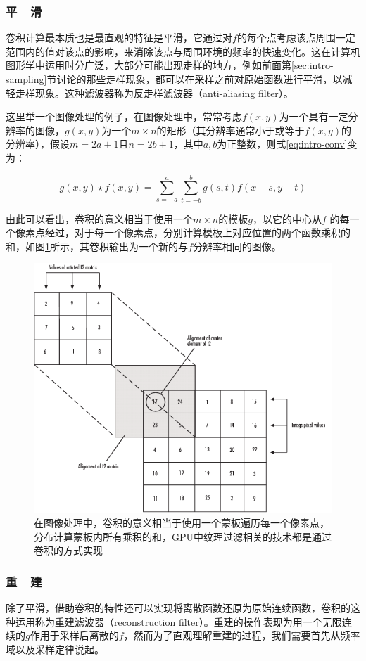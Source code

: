 \subsubsection{平~~滑}
卷积计算最本质也是最直观的特征是平滑，它通过对$f$的每个点考虑该点周围一定范围内的值对该点的影响，来消除该点与周围环境的频率的快速变化。这在计算机图形学中运用时分广泛，大部分可能出现走样的地方，例如前面第\ref{sec:intro-sampling}节讨论的那些走样现象，都可以在采样之前对原始函数进行平滑，以减轻走样现象。这种滤波器称为反走样滤波器（anti-aliasing filter）。


这里举一个图像处理的例子，在图像处理中，常常考虑$f(x,y)$为一个具有一定分辨率的图像，$g(x,y)$为一个$m\times n$的矩形（其分辨率通常小于或等于$f(x,y)$的分辨率），假设$m=2a+1$且$n=2b+1$，其中$a,b$为正整数，则式\ref{eq:intro-conv}变为：

\begin{equation}\label{eq:intro-convolution-2}
	g(x,y)\star f(x,y)=\sum^{a}_{s=-a}\sum^{b}_{t=-b}g(s,t)f(x-s,y-t)
\end{equation}

\noindent 由此可以看出，卷积的意义相当于使用一个$m\times n$的模板$g$，以它的中心从$f$ 的每一个像素点经过，对于每一个像素点，分别计算模板上对应位置的两个函数乘积的和，如图\ref{f:intro-conv}所示，其卷积输出为一个新的与$f$分辨率相同的图像。

\begin{figure}
\sidecaption
	\includegraphics[width=.5\textwidth]{figures/intro/conv}
	\caption{在图像处理中，卷积的意义相当于使用一个蒙板遍历每一个像素点，分布计算蒙板内所有乘积的和，GPU中纹理过滤相关的技术都是通过卷积的方式实现}
	\label{f:intro-conv}
\end{figure}





\subsubsection{重~~建}
除了平滑，借助卷积的特性还可以实现将离散函数还原为原始连续函数，卷积的这种运用称为重建滤波器（reconstruction filter）。重建的操作表现为用一个无限连续的$g$作用于采样后离散的$f$，然而为了直观理解重建的过程，我们需要首先从频率域以及采样定律说起。

